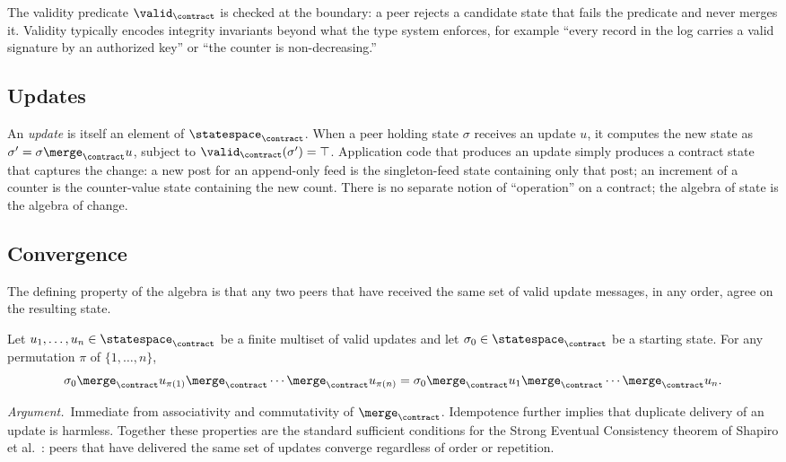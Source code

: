 The validity predicate $\valid_\contract$ is checked at the boundary: a peer rejects a candidate state that fails the predicate and never merges it. Validity typically encodes integrity invariants beyond what the type system enforces, for example ``every record in the log carries a valid signature by an authorized key'' or ``the counter is non-decreasing.''

\subsection{Updates}

An \emph{update} is itself an element of $\statespace_\contract$. When a peer holding state $\sigma$ receives an update $u$, it computes the new state as $\sigma' = \sigma \merge_\contract u$, subject to $\valid_\contract(\sigma') = \top$. Application code that produces an update simply produces a contract state that captures the change: a new post for an append-only feed is the singleton-feed state containing only that post; an increment of a counter is the counter-value state containing the new count. There is no separate notion of ``operation'' on a contract; the algebra of state is the algebra of change.

\subsection{Convergence}

The defining property of the algebra is that any two peers that have received the same set of valid update messages, in any order, agree on the resulting state.

\begin{proposition}[Convergence]
\label{prop:convergence}
Let $u_1, \ldots, u_n \in \statespace_\contract$ be a finite multiset of valid updates and let $\sigma_0 \in \statespace_\contract$ be a starting state. For any permutation $\pi$ of $\{1, \ldots, n\}$,
\[
  \sigma_0 \merge_\contract u_{\pi(1)} \merge_\contract \cdots \merge_\contract u_{\pi(n)} = \sigma_0 \merge_\contract u_1 \merge_\contract \cdots \merge_\contract u_n.
\]
\end{proposition}

\noindent \emph{Argument.}\ Immediate from associativity and commutativity of $\merge_\contract$. Idempotence further implies that duplicate delivery of an update is harmless. Together these properties are the standard sufficient conditions for the Strong Eventual Consistency theorem of Shapiro et al.\ \citep{shapiro2011crdt}: peers that have delivered the same set of updates converge regardless of order or repetition.

